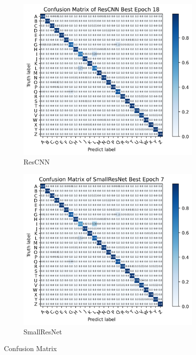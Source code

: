 \documentclass{article}
\begin{document}
\begin{figure}[!ht]
    \begin{subfigure}{0.45\textwidth}
        \centering
        \includegraphics[width=\linewidth]{confusion_matrix_rescnn.png}
        \caption{ResCNN}
        \label{fig:sub3}
    \end{subfigure}
    \hfill
    \begin{subfigure}{0.45\textwidth}
        \centering
        \includegraphics[width=\linewidth]{confusion_matrix_smallresnet.png}
        \caption{SmallResNet}
        \label{fig:sub4}
    \end{subfigure}
    
    \caption{Confusion Matrix}
    \label{fig:confusion_matrix}
\end{figure}
\end{document}
